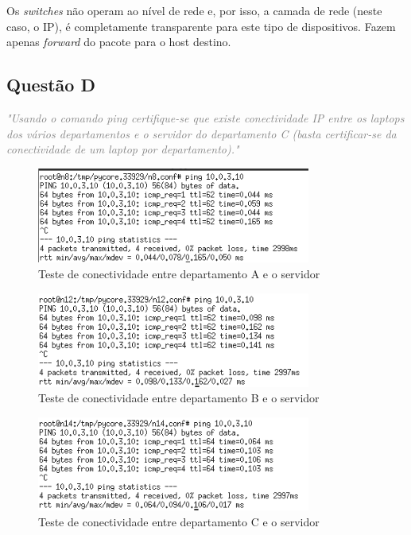 \documentclass{llncs}
\newcommand{\questionE}[1]{\textcolor{gray}{\textit{"#1"}}}
\begin{document}
Os \textit{switches} não operam ao nível de rede e, por isso, a camada de rede (neste caso, o IP), é completamente transparente para este tipo de dispositivos. Fazem apenas \textit{forward} do pacote para o host destino.

\subsection{Questão D}
\hspace{3mm}
\questionE{Usando o comando ping certifique-se que existe conectividade IP entre os laptops dos vários departamentos e o servidor do departamento C (basta	certificar-se da conectividade de um laptop por departamento).}\\

\begin{figure}[H]
\begin{center}
\includegraphics[width=9cm]{PARTEB_1d_n8TOsv.PNG}
\end{center}
\caption{Teste de conectividade entre departamento A e o servidor}
\end{figure}

\begin{figure}[H]
\begin{center}
\includegraphics[width=9cm]{PARTEB_1d_n12TOsv.PNG}
\end{center}
\caption{Teste de conectividade entre departamento B e o servidor}
\end{figure}

\begin{figure}[H]
\begin{center}
\includegraphics[width=9cm]{PARTEB_1d_n14TOsv.PNG}
\end{center}
\caption{Teste de conectividade entre departamento C e o servidor}
\end{figure}
\end{document}
